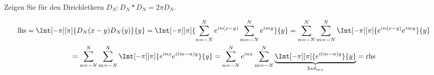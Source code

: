 
\begin{exercise}

Zeigen Sie für den Dirichletkern $D_N: D_N \ast D_N = 2 \pi D_N$.

\end{exercise}


\begin{solution}

\phantom{}


\begin{multline*}
    \mathrm{lhs}
    =
    \Int[-\pi][\pi]
    {
        D_N(x - y)
        D_N(y)
    }{y}
    =
    \Int[-\pi][\pi]
    {
        \sum_{n=-N}^N
        e^{i n (x - y)}
        \sum_{m=-N}^N
        e^{i m y}
    }{y}
    =
    \sum_{n=-N}^N
    \sum_{m=-N}^N
    \Int[-\pi][\pi]
    {
        e^{i n (x - y)}
        e^{i m y}
    }{y} \\
    =
    \sum_{n=-N}^N
    \sum_{m=-N}^N
    \Int[-\pi][\pi]
    {
        e^{i n x}
        e^{i (m - n) y}
    }{y}
    =
    \sum_{n=-N}^N
    e^{i n x}
    \sum_{m=-N}^N
    \underbrace
    {
        \Int[-\pi][\pi]
        {
            e^{i (m - n) y}
        }{y}    
    }_{
        2 \pi \delta_{m n}
    }
    =
    \mathrm{rhs}
\end{multline*}

\end{solution}

